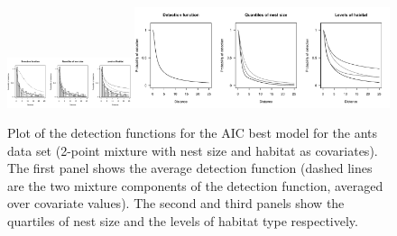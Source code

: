 \documentclass{report}
\begin{document}
\begin{figure}[H]
\centering
\includegraphics[width=0.3333\textwidth, trim=0 0 5.73228347in 0, clip=true]{analyses/ants-nesthab-1.pdf}\includegraphics[width=0.6666\textwidth, trim=2.86614173in 0 0 0, clip=true]{analyses/ants-nesthab-2.pdf}
\caption{Plot of the detection functions for the AIC best model for the ants data set (2-point mixture with nest size and habitat as covariates). The first panel shows the average detection function (dashed lines are the two mixture components of the detection function, averaged over covariate values). The second and third panels show the quartiles of nest size and the levels of habitat type respectively.}
\label{ants-nesthab}
\end{figure}
\end{document}
